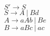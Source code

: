 \begin{center}
    $S' \to S$ \\
    $S \to A \ | \ Bd$ \\
    $A \to aAb \ | \ Be $ \\
    $B \to aBc \ | \ ac$
\end{center}